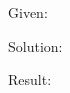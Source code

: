 \documentclass[a4paper, 10pt]{scrartcl}
\begin{document}
\section{}

Given:

Solution:

Result:
\end{document}
